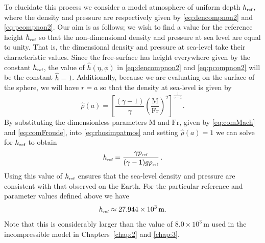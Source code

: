 To elucidate this process we consider a model atmosphere of uniform depth $h_{\mbox{\tiny ref}}$, where the density and pressure are respectively given by \eqref{eq:dencompnon2} and \eqref{eq:pcompnon2}. Our aim is as follows; we wish to find a value for the reference height $h_{\mbox{\tiny ref}}$ so that the non-dimensional density and pressure at sea level are equal to unity. That is, the dimensional density and pressure at sea-level take their characteristic values. Since the free-surface has height everywhere given by the constant $h_{\mbox{\tiny ref}}$, the value of $\hat{h}(\eta,\phi)$ in \eqref{eq:dencompnon2} and \eqref{eq:pcompnon2} will be the constant $\hat{h}=1$. Additionally, because we are evaluating on the surface of the sphere, we will have $r=a$ so that the density at sea-level is given by
\begin{equation}
\hat{\rho}(a) =\left[\frac{(\gamma-1)}{\gamma}\left( \frac{\mbox{M}}{\mbox{Fr}}\right)^2 \right]^{\frac{1}{\gamma-1}}.
\label{eq:rhosimpatmos}
\end{equation}
By substituting the dimensionless parameters $\mbox{M}$ and $\mbox{Fr}$, given by \eqref{eq:comMach} and \eqref{eq:comFroude}, into \eqref{eq:rhosimpatmos} and setting $\hat{\rho}(a)=1$ we can solve for $h_{\mbox{\tiny ref}}$ to obtain
\begin{equation}
h_{\mbox{\tiny ref}} = \frac{\gamma p_{\mbox{\tiny ref}}}{(\gamma-1) g \rho_{\mbox{\tiny ref}}} \,. \label{eq:hrefvalcom}
\end{equation}
Using this value of $h_{\mbox{\tiny ref}}$ ensures that the sea-level density and pressure are consistent with that observed on the Earth. For the particular reference and parameter values defined above we have
\begin{equation*}
h_{\mbox{\tiny ref}} \approx 27.944\times10^{3}\,\text{m}.
\end{equation*}
Note that this is considerably larger than the value of $8.0\times10^{3}\,\text{m}$ used in the incompressible model in Chapters~\ref{chap:2} and \ref{chap:3}.

